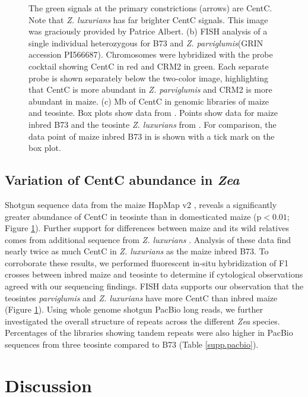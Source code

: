 \begin{figure}
{The green signals at the primary constrictions (arrows) are CentC.
Note that \emph{Z. luxurians} has far brighter CentC signals.
This image was graciously provided by Patrice Albert.
(b) FISH analysis of a single individual heterozygous for B73 and \emph{Z. parviglumis}(GRIN accession PI566687).
Chromosomes were hybridized with the \citet{Shi2010} probe cocktail showing CentC in red and CRM2 in green. 
Each separate probe is shown separately below the two-color image, highlighting that CentC is more abundant in \emph{Z. parviglumis} and CRM2 is more abundant in maize. 
(c)  Mb of CentC in genomic libraries of maize and teosinte. 
Box plots show data from \citet{Chia2012}. 
Points show data for maize inbred B73 and the teosinte \emph{Z. luxurians} from \citet{Tenaillon2011}. For comparison, the data point of maize inbred B73 in \citet{Chia2012} is shown with a tick mark on the box plot.
}
\label{abundance}    
\end{figure}

\subsection*{Variation of CentC abundance in \emph{Zea}}

Shotgun sequence data from the maize HapMap v2 \citep{Chia2012}, reveals a significantly greater abundance of CentC in teosinte than in domesticated maize (p$<0.01$; Figure \ref{abundance}).   
Further support for differences between maize and its wild relatives comes from additional  sequence  from \emph{Z. luxurians} \citep{Tenaillon2011}.  
Analysis of these data find nearly twice as much CentC in \emph{Z. luxurians} as the maize inbred B73.  
To corroborate these results, we performed fluorescent in-situ hybridization of F1 crosses between inbred maize and teosinte to determine if cytological observations agreed with our sequencing findings.   
FISH data supports our observation that the teosintes \emph{parviglumis} and \emph{Z. luxurians} have more CentC than inbred maize (Figure \ref{abundance}).
Using whole genome shotgun PacBio long reads, we further investigated the overall structure of repeats across the different \emph{Zea} species.
Percentages of the libraries showing tandem repeats were also higher in PacBio sequences from three teosinte compared to B73 (Table \ref{supp.pacbio}).

\section*{Discussion}
\label{discussion}

